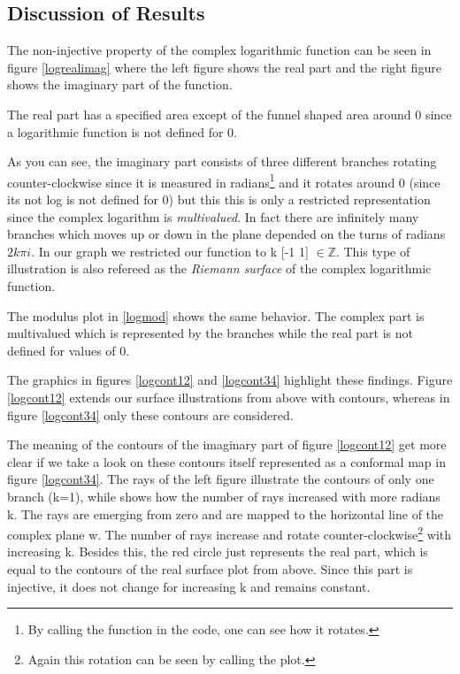 \documentclass[a4paper,11pt]{article}
\begin{document}
\subsection{Discussion of Results}
The non-injective property of the complex logarithmic function can be seen in figure \ref{logrealimag} where the left figure shows the real part and the right figure shows the imaginary part of the function. 

The real part has a specified area except of the funnel shaped area around 0 since a logarithmic function is not defined for 0. 

As you can see, the imaginary part consists of three different branches rotating  counter-clockwise since it is measured in radians\footnote{By calling the function in the code, one can see how it rotates.} and it rotates around 0 (since its not log is not defined for 0) but this this is only a restricted representation since the complex logarithm is \textit{multivalued}. In fact there are infinitely many branches which moves up or down in the plane depended on the turns of radians $2k\pi i$.  In our graph we restricted our function to k [-1 1] $\in \mathbb{Z}$. This type of illustration is also refereed as the \textit{Riemann surface} of the complex logarithmic function.

The modulus plot in \ref{logmod} shows the same behavior. The complex part is multivalued which is represented by the branches while the real part is not defined for values of 0.

The graphics in figures \ref{logcont12} and \ref{logcont34} highlight these findings. Figure \ref{logcont12} extends our surface illustrations from above with contours, whereas in figure \ref{logcont34} only these contours are considered. 

The meaning of the contours of the imaginary part of figure \ref{logcont12} get more clear if we take a look on these contours itself represented as a conformal map in figure \ref{logcont34}. The rays of the left figure illustrate the contours of only one branch (k=1), while shows how the number of rays increased with more radians k. The rays are emerging from zero and are mapped to the horizontal line of the complex plane w. The number of rays increase and rotate counter-clockwise\footnote{Again this rotation can be seen by calling the plot.}  with increasing k. Besides this, the red circle just represents the real part, which is equal to the contours of the real surface plot from above. Since this part is injective, it does not change for increasing k and remains constant.
\end{document}
